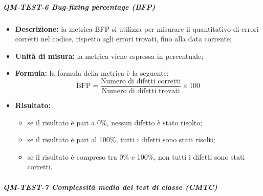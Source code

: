             \subparagraph{QM-TEST-6 Bug-fixing percentage (BFP)}
            \begin{itemize}
                \item \textbf{Descrizione: }
                la metrica BFP si utilizza per misurare il quantitativo di errori corretti nel codice, rispetto agli errori trovati, fino alla data corrente;

                \item \textbf{Unità di misura: }
                la metrica viene espressa in percentuale;

                \item \textbf{Formula: }
                la formula della metrica è la seguente:
                \[
                    \text{BFP} = \frac{\text{Numero di difetti corretti}}{\text{Numero di difetti trovati}} \times 100
                \]

                \item \textbf{Risultato: }
                \begin{itemize}
                    \item se il risultato è pari a 0\%, nessun difetto è stato risolto;
                    \item se il risultato è pari al 100\%, tutti i difetti sono stati risolti;
                    \item se il risultato è compreso tra 0\% e 100\%, non tutti i difetti sono stati corretti.
                \end{itemize}
            \end{itemize}
    

            \subparagraph{QM-TEST-7 Complessità media dei test di classe (CMTC)}


